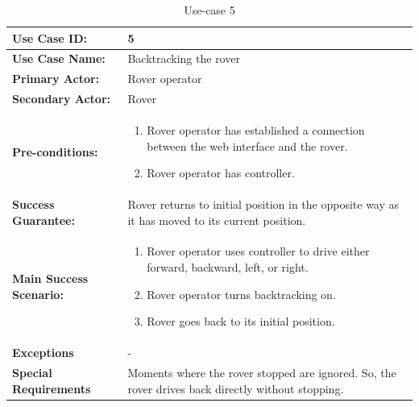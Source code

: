 \documentclass[12pt]{article}
\begin{document}
	 	\begin{table}[H]
	 		\centering
	 		\begin{tabularx}{\linewidth}{|X|X|}
	 			\hline
	 			\textbf{Use Case ID:} &5\\
	 			\hline
	 			\textbf{Use Case Name:} &Backtracking the rover\\
	 			\hline
	 			\textbf{Primary Actor:} &Rover operator\\
	 			\hline
	 			\textbf{Secondary Actor:} &Rover\\
	 			\hline
	 			\textbf{Pre-conditions:} &\begin{enumerate}
	 				\item Rover operator has established a connection between the web interface and the rover.
	 				\item Rover operator has controller.
	 			\end{enumerate}\\
	 			\hline
	 			\textbf{Success Guarantee:} &Rover returns to initial position in the opposite way as it has moved to its current position.\\
	 			\hline 
	 			\textbf{Main Success Scenario:} &\begin{enumerate}
	 				\item Rover operator uses controller to drive either forward, backward, left, or right.
	 				\item Rover operator turns backtracking on.
	 				\item Rover goes back to its initial position.
	 			\end{enumerate}\\
	 			\hline
	 			\textbf{Exceptions} &-\\
	 			\hline
	 			\textbf{Special Requirements} & Moments where the rover stopped are ignored. So, the rover drives back directly without stopping.\\
	 			\hline
	 		\end{tabularx}
	 		\caption{Use-case 5}
	 		\label{table:Use-case5}   
	 	\end{table}
\end{document}
